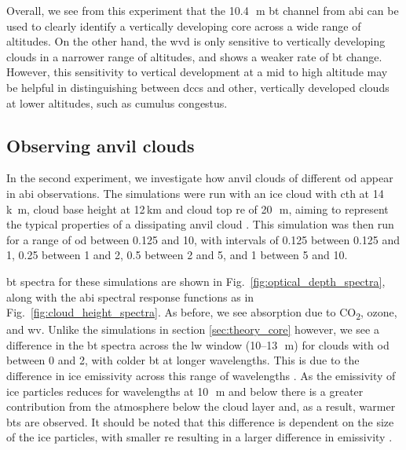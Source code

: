 Overall, we see from this experiment that the 10.4\,\unit{\mu m} \acrshort{bt} channel from \acrshort{abi} can be used to clearly identify a vertically developing core across a wide range of altitudes.
On the other hand, the \acrshort{wvd} is only sensitive to vertically developing clouds in a narrower range of altitudes, and shows a weaker rate of \acrshort{bt} change.
However, this sensitivity to vertical development at a mid to high altitude may be helpful in distinguishing between \acrshort{dcc}s and other, vertically developed clouds at lower altitudes, such as cumulus congestus.


\subsection{Observing anvil clouds}

In the second experiment, we investigate how anvil clouds of different \acrshort{od} appear in \acrshort{abi} observations.
The simulations were run with an ice cloud with \acrshort{cth} at 14\,\unit{k m}, cloud base height at 12\,\unit{km} and cloud top \acrshort{re} of 20\,\unit{\mu m}, aiming to represent the typical properties of a dissipating anvil cloud \citep{sokol_tropical_2020}.
This simulation was then run for a range of \acrshort{od} between 0.125 and 10, with intervals of 0.125 between 0.125 and 1, 0.25 between 1 and 2, 0.5 between 2 and 5, and 1 between 5 and 10.

\acrshort{bt} spectra for these simulations are shown in Fig.~\ref{fig:optical_depth_spectra}, along with the \acrshort{abi} spectral response functions as in Fig.~\ref{fig:cloud_height_spectra}.
As before, we see absorption due to CO\textsubscript{2}, ozone, and \acrshort{wv}.
Unlike the simulations in section \ref{sec:theory_core} however, we see a difference in the \acrshort{bt} spectra across the \acrshort{lw} window (10--13\,\unit{\mu m}) for clouds with \acrshort{od} between 0 and 2, with colder \acrshort{bt} at longer wavelengths.
This is due to the difference in ice emissivity across this range of wavelengths \citep{fu_radiation_2015}.
As the emissivity of ice particles reduces for wavelengths at 10\,\unit{\mu m} and below there is a greater contribution from the atmosphere below the cloud layer and, as a result, warmer \acrshort{bt}s are observed.
It should be noted that this difference is dependent on the size of the ice particles, with smaller \acrshort{re} resulting in a larger difference in emissivity \citep{dubuisson_sensitivity_2008}.


